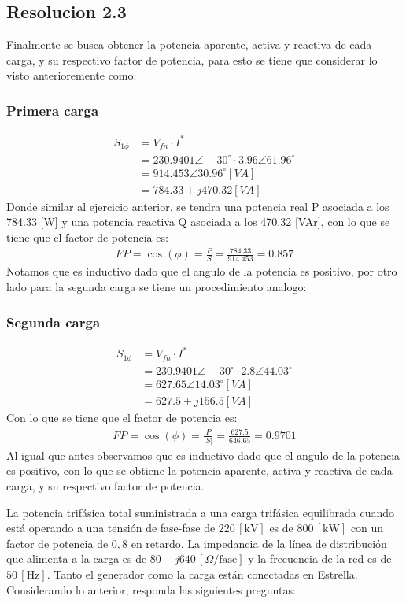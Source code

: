 \documentclass[
  11pt,
  letterpaper,
   addpoints,
   answers
  ]{exam}
\begin{document}
\begin{questions}
\begin{solution}
\subsection*{Resolucion 2.3}
Finalmente se busca obtener la potencia aparente, activa y reactiva de cada carga, y su respectivo factor de potencia, para esto se tiene que considerar lo visto anterioremente como:
\subsubsection*{Primera carga}
\begin{align}
    S_{1\phi} &= V_{fn} \cdot I^{*}\\
    &= 230.9401 \angle -30^{\circ} \cdot 3.96 \angle 61.96^{\circ}\\
    &= 914.453 \angle 30.96^{\circ} [VA]\\
    &= 784.33 + j470.32 [VA]
\end{align}
Donde similar al ejercicio anterior, se tendra una potencia real P asociada a los 784.33 [W] y una potencia reactiva Q asociada a los 470.32 [VAr], con lo que se tiene que el factor de potencia es:
\begin{align}
    FP = \cos(\phi) = \frac{P}{S} = \frac{784.33}{914.453} = 0.857
\end{align}
Notamos que es inductivo dado que el angulo de la potencia es positivo, por otro lado para la segunda carga se tiene un procedimiento analogo:
\subsubsection*{Segunda carga}
\begin{align}
    S_{1\phi} &= V_{fn} \cdot I^{*}\\
    &= 230.9401 \angle -30^{\circ} \cdot 2.8 \angle 44.03^{\circ}\\
    &= 627.65 \angle 14.03^{\circ} [VA]\\
    &= 627.5 + j 156.5 [VA]
\end{align}
Con lo que se tiene que el factor de potencia es:
\begin{align}
    FP = \cos(\phi) = \frac{P}{|S|} = \frac{627.5}{646.65} = 0.9701
\end{align}
Al igual que antes observamos que es inductivo dado que el angulo de la potencia es positivo, con lo que se obtiene la potencia aparente, activa y reactiva de cada carga, y su respectivo factor de potencia.
\end{solution}
\question La potencia trifásica total suministrada a una carga trifásica equilibrada cuando está operando a una tensión de fase-fase de \(220 \, [\text{kV}]\) es de \(800 \, [\text{kW}]\) con un factor de potencia de \(0,8\) en retardo. La impedancia de la línea de distribución que alimenta a la carga es de \(80 + j640 \, [\Omega/\text{fase}]\) y la frecuencia de la red es de \(50 \, [\text{Hz}]\). Tanto el generador como la carga están conectadas en Estrella. Considerando lo anterior, responda las siguientes preguntas:


\end{questions}
\end{document}
